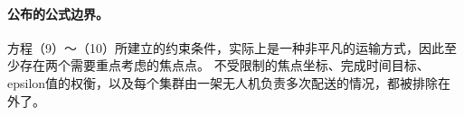 \documentclass[11pt]{article}
\begin{document}
\paragraph{公布的公式边界。}
方程（9）～（10）所建立的约束条件，实际上是一种非平凡的运输方式，因此至少存在两个需要重点考虑的焦点点。  
不受限制的焦点坐标、完成时间目标、epsilon值的权衡，以及每个集群由一架无人机负责多次配送的情况，都被排除在外了。
\end{document}
